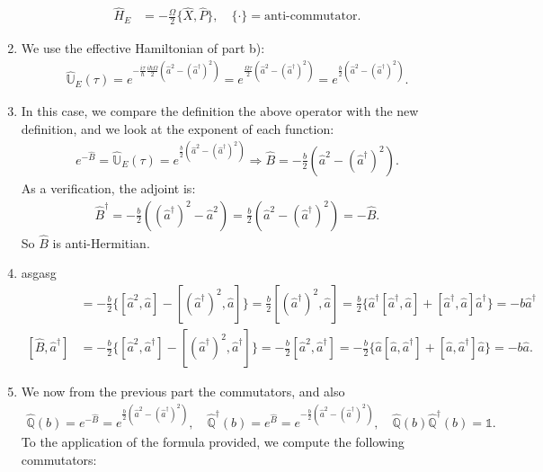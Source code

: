 \documentclass[letterpaper,11pt,twoside]{article}
\begin{document}
\begin{enumerate}[itemsep=0pt,topsep=0pt,label=\alph*)]
\begin{align*}
    \hat{H}_E&=-\frac{\Omega}{2}\{\hat{X},\hat{P}\},\quad\{\cdot\}=\text{anti-commutator}.
  \end{align*}
  \item We use the effective Hamiltonian of part b):
  \begin{align*}
    \hat{\mathbb{U}}_E(\tau)=e^{-\frac{i\tau}{\hbar}\frac{i\hbar\Omega}{2}(\hat{a}^2-(\hat{a}^\dagger)^2)}=e^{\frac{\Omega\tau}{2}(\hat{a}^2-(\hat{a}^\dagger)^2)}=e^{\frac{b}{2}(\hat{a}^2-(\hat{a}^\dagger)^2)}.
  \end{align*}
  \item In this case, we compare the definition the above operator with the new definition, and we look at the exponent of each function:
  \begin{align*}
    e^{-\hat{B}}=\hat{\mathbb{U}}_E(\tau)=e^{\frac{b}{2}(\hat{a}^2-(\hat{a}^\dagger)^2)}\Longrightarrow\hat{B}=-\frac{b}{2}(\hat{a}^2-(\hat{a}^\dagger)^2).
  \end{align*}
  As a verification, the adjoint is:
  \begin{align*}
    \hat{B}^\dagger=-\frac{b}{2}((\hat{a}^\dagger)^2-\hat{a}^2)=\frac{b}{2}(\hat{a}^2-(\hat{a}^\dagger)^2)=-\hat{B}.
  \end{align*}
  So $\hat{B}$ is anti-Hermitian.
  \item asgasg
  \begin{align*}
    [\hat{B},\hat{a}]&=-\frac{b}{2}\{[\hat{a}^2,\hat{a}]-[(\hat{a}^\dagger)^2,\hat{a}]\}=\frac{b}{2}[(\hat{a}^\dagger)^2,\hat{a}]=\frac{b}{2}\{\hat{a}^\dagger[\hat{a}^\dagger,\hat{a}]+[\hat{a}^\dagger,\hat{a}]\hat{a}^\dagger\}=-b\hat{a}^\dagger\\
    [\hat{B},\hat{a}^\dagger]&=-\frac{b}{2}\{[\hat{a}^2,\hat{a}^\dagger]-[(\hat{a}^\dagger)^2,\hat{a}^\dagger]\}=-\frac{b}{2}[\hat{a}^2,\hat{a}^\dagger]=-\frac{b}{2}\{\hat{a}[\hat{a},\hat{a}^\dagger]+[\hat{a},\hat{a}^\dagger]\hat{a}\}=-b\hat{a}.
  \end{align*}
  \item We now from the previous part the commutators, and also 
  \begin{align*}
    \hat{\mathbb{Q}}(b)=e^{-\hat{B}}=e^{\frac{b}{2}(\hat{a}^2-(\hat{a}^\dagger)^2)},\quad\hat{\mathbb{Q}}^\dagger(b)=e^{\hat{B}}=e^{-\frac{b}{2}(\hat{a}^2-(\hat{a}^\dagger)^2)},\quad\hat{\mathbb{Q}}(b)\hat{\mathbb{Q}}^\dagger(b)=\mathds{1}.
  \end{align*}
  To the application of the formula provided, we compute the following commutators:
  \begin{align*}

\end{align*}
\end{enumerate}
\end{document}
